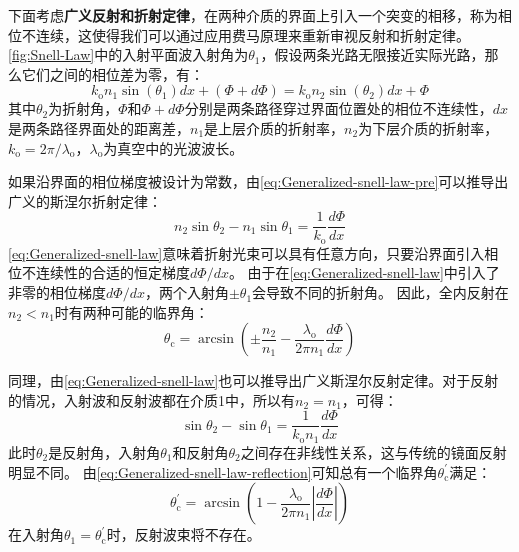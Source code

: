 \documentclass[supercite]{HustGraduPaper}
\begin{document}
下面考虑{\bfseries 广义反射和折射定律}，在两种介质的界面上引入一个突变的相移，称为相位不连续，这使得我们可以通过应用费马原理来重新审视反射和折射定律。
\autoref{fig:Snell-Law}中的入射平面波入射角为$\theta_1$，假设两条光路无限接近实际光路，那么它们之间的相位差为零，有：
\begin{equation}
	k_\mathrm{o} n_1 \sin (\theta_1) dx + (\Phi + d\Phi) = k_\mathrm{o} n_2 \sin (\theta_2) dx + \Phi
	\label{eq:Generalized-snell-law-pre}
\end{equation}
其中$ \theta_2 $为折射角，$ \Phi $和$ \Phi + d\Phi $分别是两条路径穿过界面位置处的相位不连续性，$ dx $是两条路径界面处的距离差，$n_1$是上层介质的折射率，$n_2$为下层介质的折射率，$k_\mathrm{o}=2 \pi / \lambda_\mathrm{o}$，$\lambda_\mathrm{o}$为真空中的光波波长。

如果沿界面的相位梯度被设计为常数，由\autoref{eq:Generalized-snell-law-pre}可以推导出广义的斯涅尔折射定律：
\begin{equation}
	n_2 \sin \theta_2 - n_1 \sin \theta_1 = \frac{1}{k_\mathrm{o}} \frac{d \Phi}{dx}
	\label{eq:Generalized-snell-law}
\end{equation}
\autoref{eq:Generalized-snell-law}意味着折射光束可以具有任意方向，只要沿界面引入相位不连续性的合适的恒定梯度$d\Phi/dx$。
由于在\autoref{eq:Generalized-snell-law}中引入了非零的相位梯度$d\Phi/dx$，两个入射角$\pm \theta_1$会导致不同的折射角。
因此，全内反射在$n_2<n_1$时有两种可能的临界角：
\begin{equation}
	\theta_{\mathrm{c}}=\arcsin \left(\pm \frac{n_{2}}{n_{1}}-\frac{\lambda_{\mathrm{o}}}{2 \pi n_{1}} \frac{d \Phi}{d x}\right)
\end{equation}

同理，由\autoref{eq:Generalized-snell-law}也可以推导出广义斯涅尔反射定律。对于反射的情况，入射波和反射波都在介质1中，所以有$n_2=n_1$，可得：
\begin{equation}
	\sin \theta_2 - \sin \theta_1 = \frac{1}{k_\mathrm{o} n_1} \frac{d \Phi}{dx}
	\label{eq:Generalized-snell-law-reflection}
\end{equation}
此时$\theta_2$是反射角，入射角$\theta_1$和反射角$\theta_2$之间存在非线性关系，这与传统的镜面反射明显不同。
由\autoref{eq:Generalized-snell-law-reflection}可知总有一个临界角$\theta_{\mathrm{c}}^{\prime}$满足：
\begin{equation}
	\theta_{\mathrm{c}}^{\prime}=\arcsin \left(1-\frac{\lambda_{\mathrm{o}}}{2 \pi n_{1}}\left|\frac{d \Phi}{d x}\right|\right)
\end{equation}
在入射角$\theta_1 = \theta_{\mathrm{c}}^{\prime}$时，反射波束将不存在。
\end{document}
